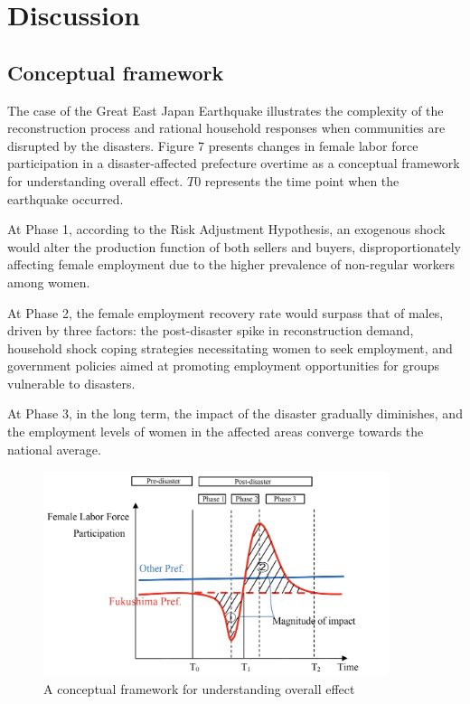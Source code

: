 \documentclass[12pt,halfline,a4paper]{ouparticle}
\begin{document}
\newpage

\section{Discussion}
\label{sec5}

\subsection{Conceptual framework}
\label{sec5.1}

The case of the Great East Japan Earthquake illustrates the complexity of the reconstruction process and rational household responses when communities are disrupted by the disasters. Figure 7 presents changes in female labor force participation in a disaster-affected prefecture overtime as a conceptual framework for understanding overall effect. $T0$ represents the time point when the earthquake occurred. 

At Phase 1, according to the Risk Adjustment Hypothesis, an exogenous shock would alter the production function of both sellers and buyers, disproportionately affecting female employment due to the higher prevalence of non-regular workers among women.

At Phase 2, the female employment recovery rate would surpass that of males, driven by three factors: the post-disaster spike in reconstruction demand, household shock coping strategies necessitating women to seek employment, and government policies aimed at promoting employment opportunities for groups vulnerable to disasters.

At Phase 3, in the long term, the impact of the disaster gradually diminishes, and the employment levels of women in the affected areas converge towards the national average.


\begin{figure}[h!]
    \centering
    \includegraphics[width=0.9\textwidth]{A conceptual model.jpeg}  %
    \caption{A conceptual framework for understanding overall effect}
    \label{fig:conceptual_model}
\end{figure}
\end{document}
